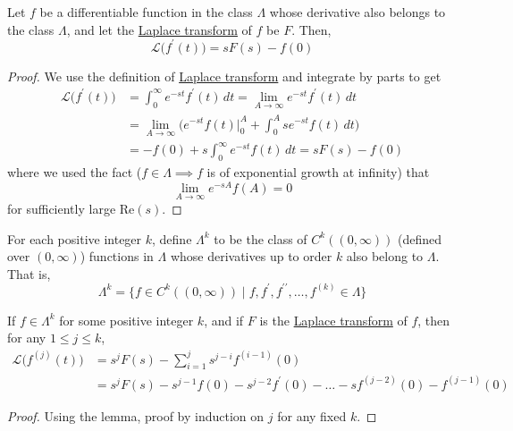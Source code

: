 \documentclass{article}
\newcounter{theorem}[section]
\newcounter{definition}[section]
\begin{document}
      \begin{lemma}
        \label{thm:laplace-transform-of-a-derivative}
      Let $f$ be a differentiable function in the class $\Lambda$ whose derivative also belongs to the class $\Lambda$, and let the \hyperref[def:laplace-transform]{Laplace transform} of $f$ be $F$. Then, 
      \begin{equation}
        \mathcal{L} \big( f^\prime (t) \big) = s F(s) - f(0)
      \end{equation}
      \end{lemma}
      \begin{proof}
      We use the definition of \hyperref[def:laplace-transform]{Laplace transform} and integrate by parts to get 
      \begin{align*}
          \mathcal{L}\big( f^\prime (t) \big) & = \int_0^\infty e^{-st} f^\prime (t) \,dt = \lim_{A \rightarrow \infty} e^{-st} f^\prime (t) \,dt \\
          & = \lim_{A\rightarrow \infty} \bigg( e^{-st} f(t) \big|_0^A + \int_0^A s e^{-st} f(t)\,dt\bigg) \\
          & = - f(0) + s\int_0^\infty e^{-st} f(t) \,dt = s F(s) - f(0)
      \end{align*}
      where we used the fact ($f \in \Lambda \implies f$ is of exponential growth at infinity) that 
      \begin{equation}
        \lim_{A \rightarrow \infty} e^{-sA} f(A) = 0
      \end{equation}
      for sufficiently large Re$(s)$. 
      \end{proof}

      \begin{definition}
        \label{def:the-class-lambdak}
      For each positive integer $k$, define $\Lambda^k$ to be the class of $C^k((0, \infty))$ (defined over $(0, \infty)$) functions in $\Lambda$ whose derivatives up to order $k$ also belong to $\Lambda$. That is, 
      \begin{equation}
        \Lambda^k = \{f \in C^k((0, \infty))\;|\; f, f^\prime, f^{\prime\prime}, \ldots, f^{(k)} \in \Lambda \}
      \end{equation}
      \end{definition}

      \begin{theorem}
        \label{thm:laplace-transform-of-derivatives}
      If $f \in \Lambda^k$ for some positive integer $k$, and if $F$ is the \hyperref[def:laplace-transform]{Laplace transform} of $f$, then for any $1 \leq j \leq k$, 
      \begin{align*}
          \mathcal{L}\big( f^{(j)} (t) \big) & = s^j F(s) - \sum_{i=1}^j s^{j-i} f^{(i-1)}(0) \\
          & = s^j F(s) - s^{j-1} f(0) - s^{j-2} f^\prime (0) - \ldots - s f^{(j-2)}(0) - f^{(j-1)} (0)
      \end{align*}
      \end{theorem}
      \begin{proof}
      Using the lemma, proof by induction on $j$ for any fixed $k$. 
      \end{proof}
\end{document}
